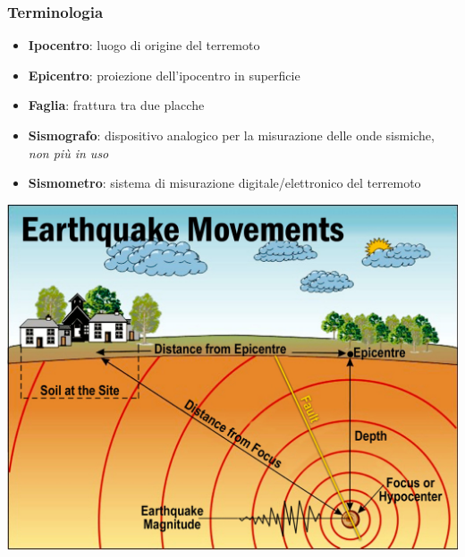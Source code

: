 \begin{frame}
	\frametitle{Terminologia}
	\begin{itemize}
	\item \textbf{Ipocentro}: luogo di origine del terremoto
	\item \textbf{Epicentro}: proiezione dell'ipocentro in superficie
	\item \textbf{Faglia}: frattura tra due placche
	\item \textbf{Sismografo}: dispositivo analogico per la misurazione delle onde sismiche, \textit{non più in uso}
	\item \textbf{Sismometro}: sistema di misurazione digitale/elettronico del terremoto
	\end{itemize}
\end{frame}
\begin{frame}
	\includegraphics[keepaspectratio=true,width=0.8\paperwidth]{earthquake-points}
\end{frame}
